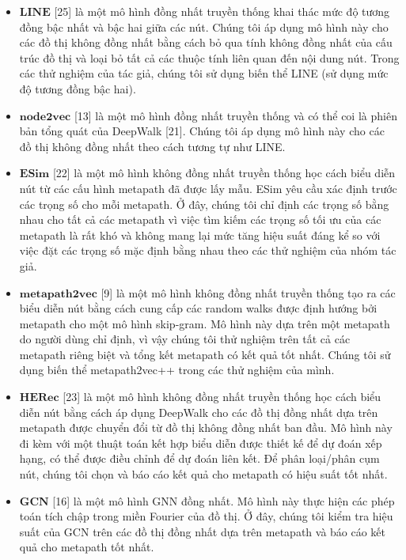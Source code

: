 \begin{table}[]
\begin{tabular}{|l|l|l|l|}
  \end{tabular}
  \end{table}

\begin{itemize}
  \item $\mathbf{LINE}$ [25] là một mô hình đồng nhất truyền thống khai thác mức độ tương đồng bậc nhất và bậc hai giữa các nút. Chúng tôi áp dụng mô hình này cho các đồ thị không đồng nhất bằng cách bỏ qua tính không đồng nhất của cấu trúc đồ thị và loại bỏ tất cả các thuộc tính liên quan đến nội dung nút. Trong các thử nghiệm của tác giả, chúng tôi sử dụng biến thể LINE (sử dụng mức độ tương đồng bậc hai).
  \item $\mathbf{node2vec}$ [13] là một mô hình đồng nhất truyền thống và có thể coi là phiên bản tổng quát của DeepWalk [21]. Chúng tôi áp dụng mô hình này cho các đồ thị không đồng nhất theo cách tương tự như LINE.
  \item $\mathbf{ESim}$ [22] là một mô hình không đồng nhất truyền thống học cách biểu diễn nút từ các cấu hình metapath đã được lấy mẫu. ESim yêu cầu xác định trước các trọng số cho mỗi metapath. Ở đây, chúng tôi chỉ định các trọng số bằng nhau cho tất cả các metapath vì việc tìm kiếm các trọng số tối ưu của các metapath là rất khó và không mang lại mức tăng hiệu suất đáng kể so với việc đặt các trọng số mặc định bằng nhau theo các thử nghiệm của nhóm tác giả.
  \item $\mathbf{metapath2vec}$ [9] là một mô hình không đồng nhất truyền thống tạo ra các biểu diễn nút bằng cách cung cấp các random walks được định hướng bởi metapath cho một mô hình skip-gram. Mô hình này dựa trên một metapath do người dùng chỉ định, vì vậy chúng tôi thử nghiệm trên tất cả các metapath riêng biệt và tổng kết metapath có kết quả tốt nhất. Chúng tôi sử dụng biến thể metapath2vec++ trong các thử nghiệm của mình. 
  \item $\mathbf{HERec}$ [23] là một mô hình không đồng nhất truyền thống học cách biểu diễn nút bằng cách áp dụng DeepWalk cho các đồ thị đồng nhất dựa trên metapath được chuyển đổi từ đồ thị không đồng nhất ban đầu. Mô hình này đi kèm với một thuật toán kết hợp biểu diễn được thiết kế để dự đoán xếp hạng, có thể được điều chỉnh để dự đoán liên kết. Để phân loại/phân cụm nút, chúng tôi chọn và báo cáo kết quả cho metapath có hiệu suất tốt nhất.
  \item $\mathbf{GCN}$ [16] là một mô hình GNN đồng nhất. Mô hình này thực hiện các phép toán tích chập trong miền Fourier của đồ thị. Ở đây, chúng tôi kiểm tra hiệu suất của GCN trên các đồ thị đồng nhất dựa trên metapath và báo cáo kết quả cho metapath tốt nhất.

\end{itemize}
